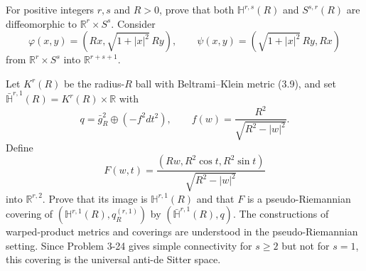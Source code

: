 \begin{exercise}
\label{prob:diffeomorphism-pseudohyperbolic-pseudosphere}
For positive integers $r,s$ and $R>0$, prove that both
$\mathbb H^{r,s}(R)$ and $S^{s,r}(R)$ are diffeomorphic to
$\mathbb R^r\times S^s$. Consider
\[
\varphi(x,y)=\left(Rx,\sqrt{1+|x|^2}\,Ry\right),
\qquad
\psi(x,y)=\left(\sqrt{1+|x|^2}\,Ry,Rx\right)
\]
from $\mathbb R^r\times S^s$ into $\mathbb R^{r+s+1}$.
\end{exercise}

\begin{exercise}
\label{prob:universal-anti-de-sitter}
Let $K^r(R)$ be the radius-$R$ ball with Beltrami--Klein metric (3.9), and set
$\bar{\mathbb H}^{r,1}(R)=K^r(R)\times\mathbb R$ with
\[
q=\bar g_R^2\oplus(-f^2dt^2),
\qquad
f(w)=\frac{R^2}{\sqrt{R^2-|w|^2}}.
\]
Define
\[
F(w,t)=\frac{(Rw,R^2\cos t,R^2\sin t)}{\sqrt{R^2-|w|^2}}
\]
into $\mathbb R^{r,2}$. Prove that its image is
$\mathbb H^{r,1}(R)$ and that $F$ is a pseudo-Riemannian covering of
$(\mathbb H^{r,1}(R),q_R^{(r,1)})$ by $(\bar{\mathbb H}^{r,1}(R),q)$.
The constructions of warped-product metrics and coverings are understood in the
pseudo-Riemannian setting. Since Problem 3-24 gives simple connectivity for
$s\geq2$ but not for $s=1$, this covering is the universal anti-de Sitter space.
\end{exercise}
